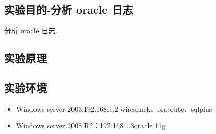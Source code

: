 \subsection{实验目的-分析 oracle 日志}
分析 oracle 日志.
%
\subsection{实验原理}
%
\subsection{实验环境}
\begin{itemize}
  \item Windows server 2003:192.168.1.2 wireshark、orabrute、sqlplus
  \item Windows server 2008 R2：192.168.1.3oracle 11g
\end{itemize}
%
